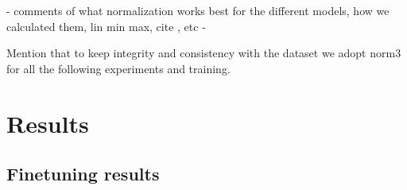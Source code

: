 \documentclass[a4paper, oneside, english]{sapthesis}
\begin{document}
- comments of what normalization works best for the different models, how we calculated them, lin min max, cite \cite{unknown}, etc - 

Mention that to keep integrity and consistency with the dataset we adopt norm3 for all the following experiments and training.


\chapter{Results} %

\section{Finetuning results}

\end{document}
